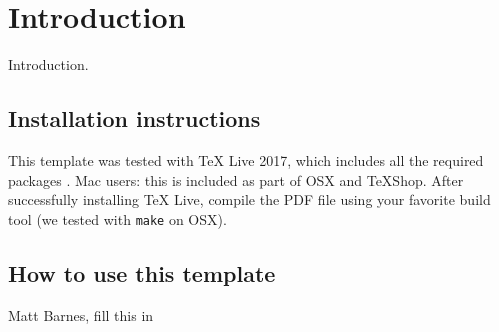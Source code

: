 
\chapter{Introduction} \label{secIntro}

Introduction.

\section{Installation instructions}

This template was tested with TeX Live 2017, which includes all the required packages \cite{TUG2017}. Mac users: this is included as part of OSX and TeXShop. After successfully installing TeX Live, compile the PDF file using your favorite build tool (we tested with \verb!make! on OSX).

\section{How to use this template}
Matt Barnes, fill this in
